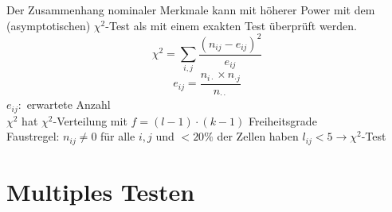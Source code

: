 \documentclass[10pt]{report}
\theoremstyle{definition}
\begin{document}
Der Zusammenhang nominaler Merkmale kann mit höherer Power mit dem (asymptotischen) $\chi^2$-Test als mit einem exakten Test überprüft werden.
\[ \chi^2 = \sum\limits_{i,j} \frac{(n_{ij} - e_{ij})^2}{e_{ij}} \]
\[ e_{ij}= \frac{n_{i\cdot} \times n_{\cdot j}}{n_{\cdot \cdot}} \]
$e_{ij}:$ erwartete Anzahl \\
$\chi^2$ hat $\chi^2$-Verteilung mit $f=(l-1)\cdot(k-1)$ Freiheitsgrade \\
Faustregel: $n_{ij} \neq 0$ für alle $i,j$ und $< 20 \%$ der Zellen haben $l_{ij} < 5 \rightarrow \chi^2$-Test \\

\chapter{Multiples Testen}
\end{document}
